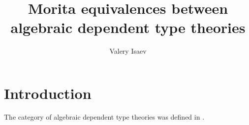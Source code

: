 \documentclass[reqno]{amsart}
\theoremstyle{definition}
\theoremstyle{remark}
\newcommand{\cat}[1]{\mathbf{#1}}
\newcommand{\Mod}[1]{#1\text{-}\cat{Mod}}
\numberwithin{figure}{section}
\begin{document}
\title{Morita equivalences between algebraic dependent type theories}

\author{Valery Isaev}

\begin{abstract}
\end{abstract}

\maketitle

\section{Introduction}

The category of algebraic dependent type theories was defined in \cite{alg-tt}.





\end{document}
